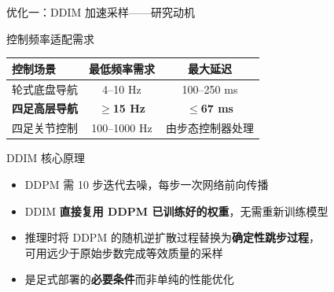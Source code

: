 \documentclass[aspectratio=169,10pt]{beamer}
\begin{document}
\begin{frame}{优化一：DDIM 加速采样——研究动机}
\begin{block}{控制频率适配需求}
\centering
\begin{tabular}{lcc}
\toprule
\textbf{控制场景} & \textbf{最低频率需求} & \textbf{最大延迟} \\
\midrule
轮式底盘导航 & 4--10 Hz & 100--250 ms \\
\rowcolor{sjtuRed!10}
\textbf{四足高层导航} & \textbf{$\geq$15 Hz} & \textbf{$\leq$67 ms} \\
四足关节控制 & 100--1000 Hz & 由步态控制器处理 \\
\bottomrule
\end{tabular}
\end{block}
\vspace{3mm}
\begin{block}{DDIM 核心原理}
\begin{itemize}
\item DDPM 需 10 步迭代去噪，每步一次网络前向传播
\item DDIM \textbf{直接复用 DDPM 已训练好的权重}，无需重新训练模型
\item 推理时将 DDPM 的随机逆扩散过程替换为\textbf{确定性跳步过程}，\\
可用远少于原始步数完成等效质量的采样
\item 是足式部署的\textbf{必要条件}而非单纯的性能优化
\end{itemize}
\end{block}
\end{frame}
\end{document}
